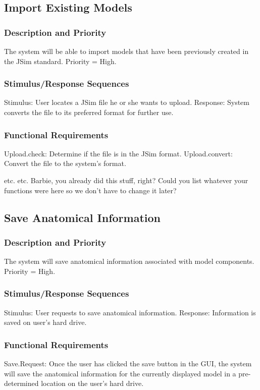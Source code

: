\documentclass{article}
\begin{document}
\subsection{Import Existing Models}

\subsubsection{Description and Priority}
The system will be able to import models that have been previously created in the JSim standard.
Priority = High.

\subsubsection{Stimulus/Response Sequences}

Stimulus: User locates a JSim file he or she wants to upload.
Response: System converts the file to its preferred format for further use.

\subsubsection{Functional Requirements}
Upload.check: Determine if the file is in the JSim format.
Upload.convert: Convert the file to the system's format.

etc. etc. Barbie, you already did this stuff, right?  Could you list whatever your functions were here so we don't have to change it later?

\subsection{Save Anatomical Information}
\subsubsection{Description and Priority}
The system will save anatomical information associated with model components.  Priority = High.

\subsubsection{Stimulus/Response Sequences}

Stimulus: User requests to save anatomical information.
Response: Information is saved on user's hard drive.

\subsubsection{Functional Requirements}
Save.Request: Once the user has clicked the save button in the GUI, the system will save the anatomical information for the currently displayed model in a pre-determined location on the user's hard drive.
\end{document}
